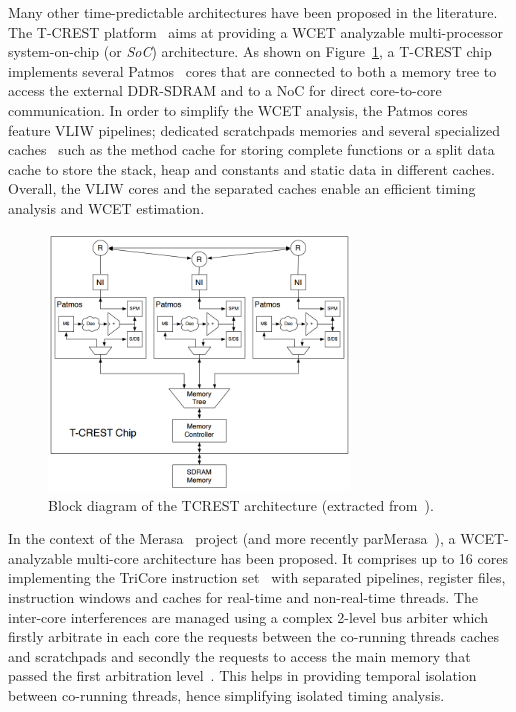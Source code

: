 \documentclass[main.tex]{subfiles}
\begin{document}
Many other time-predictable architectures have been proposed in the literature. The T-CREST platform~\cite{tcrest2015} aims at providing a WCET analyzable multi-processor system-on-chip (or \emph{SoC}) architecture. As shown on Figure~\ref{fig_stateOfTheArt_TCRESTarchi}, a T-CREST chip implements several Patmos~\cite{patmos2011} cores that are connected to both a memory tree to access the external DDR-SDRAM and to a NoC for direct core-to-core communication. In order to simplify the WCET analysis, the Patmos cores feature VLIW pipelines; dedicated scratchpads memories and several specialized caches~\cite{Schoeberl2009} such as the method cache for storing complete functions or a split data cache to store the stack, heap and constants and static data in different caches. Overall, the VLIW cores and the separated caches enable an efficient timing analysis and WCET estimation.\\

\begin{figure}
    \centering
    \includegraphics[width=8cm]{imgs/png/stateOfTheArt_TCRESTarchi.png}
    \caption{Block diagram of the TCREST architecture (extracted from~\cite{tcrest2015}).}
    \label{fig_stateOfTheArt_TCRESTarchi}
\end{figure}


In the context of the Merasa~\cite{Merasa} project (and more recently parMerasa~\cite{parMerasa}), a WCET-analyzable multi-core architecture has been proposed. It comprises up to 16 cores implementing the TriCore instruction set~\cite{TriCore} with separated pipelines, register files, instruction windows and caches for real-time and non-real-time threads. The inter-core interferences are managed using a complex 2-level bus arbiter which firstly arbitrate in each core the requests between the co-running threads caches and scratchpads and secondly the requests to access the main memory that passed the first arbitration level~\cite{Paolieri2009_SIGARCH}. This helps in providing temporal isolation between co-running threads, hence simplifying isolated timing analysis. \\
\end{document}
